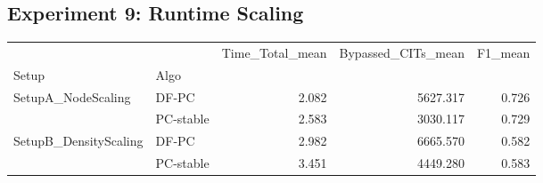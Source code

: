 \subsection*{Experiment 9: Runtime Scaling}
\begin{tabular}{llrrr}
\toprule
                      &           &  Time\_Total\_mean &  Bypassed\_CITs\_mean &  F1\_mean \\
Setup & Algo &                  &                     &          \\
\midrule
SetupA\_NodeScaling & DF-PC &            2.082 &            5627.317 &    0.726 \\
                      & PC-stable &            2.583 &            3030.117 &    0.729 \\
SetupB\_DensityScaling & DF-PC &            2.982 &            6665.570 &    0.582 \\
                      & PC-stable &            3.451 &            4449.280 &    0.583 \\
\bottomrule
\end{tabular}


